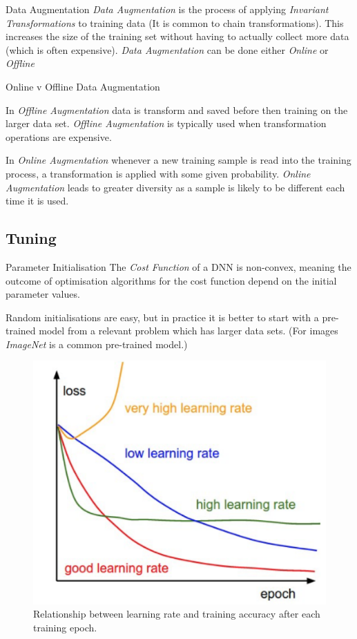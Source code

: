 \documentclass[11pt,a4paper]{article}
\begin{document}
  \begin{definition}{Data Augmentation}
    \textit{Data Augmentation} is the process of applying \textit{Invariant Transformations} to training data (It is common to chain transformations). This increases the size of the training set without having to actually collect more data (which is often expensive). \textit{Data Augmentation} can be done either \textit{Online} or \textit{Offline}
  \end{definition}

  \begin{proposition}{Online v Offline Data Augmentation}
    \par In \textit{Offline Augmentation} data is transform and saved before then training on the larger data set. \textit{Offline Augmentation} is typically used when transformation operations are expensive.
    \par In \textit{Online Augmentation} whenever a new training sample is read into the training process, a transformation is applied with some given probability. \textit{Online Augmentation} leads to greater diversity as a sample is likely to be different each time it is used.
  \end{proposition}

\subsection{Tuning} \label{sec_Tuning}

  \begin{remark}{Parameter Initialisation}
    The \textit{Cost Function} of a DNN is non-convex, meaning the outcome of optimisation algorithms for the cost function depend on the initial parameter values.
    \par Random initialisations are easy, but in practice it is better to start with a pre-trained model from a relevant problem which has larger data sets. (For images \textit{ImageNet} is a common pre-trained model.)
  \end{remark}

  \begin{figure}[H]
    \begin{center}
      \includegraphics[width=.35\textwidth]{DifferentLearningRates.PNG}
    \end{center}
    \caption{ Relationship between learning rate and training accuracy after each training epoch. }
    \label{fig_Different_LRs}
  \end{figure}
\end{document}

